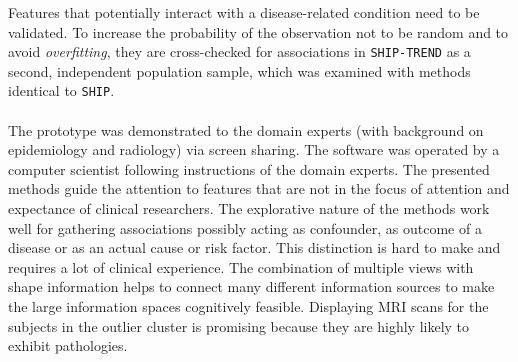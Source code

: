 \documentclass[journal]{style/vgtc} 			          %
\begin{document}
Features that potentially interact with a disease-related condition need to be validated.
%
To increase the probability of the observation not to be random and to avoid \emph{overfitting}, they are cross-checked for associations in \texttt{SHIP-TREND} as a second, independent population sample, which was examined with methods identical to \texttt{SHIP}.
%
\\\\
The prototype was demonstrated to the domain experts (with background on epidemiology and radiology) via screen sharing.
%
The software was operated by a computer scientist following instructions of the domain experts.
%
The presented methods guide the attention to features that are not in the focus of attention and expectance of clinical researchers.
%
The explorative nature of the methods work well for gathering associations possibly acting as confounder, as outcome of a disease or as an actual cause or risk factor.
%
This distinction is hard to make and requires a lot of clinical experience.
%
The combination of multiple views with shape information helps to connect many different information sources to make the large information spaces cognitively feasible.
%
Displaying MRI scans for the subjects in the outlier cluster is promising because they are highly likely to exhibit pathologies.
%

\end{document}
